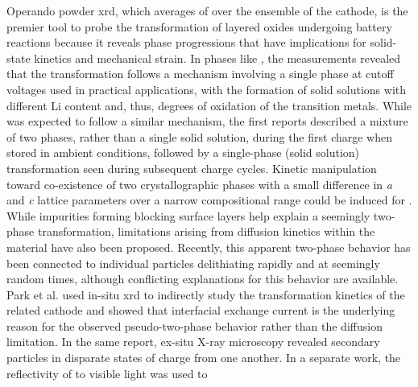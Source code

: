 \documentclass{article}
\begin{document}


Operando powder \gls{xrd}, which averages of over the ensemble of the cathode, is the premier tool to probe the transformation of layered oxides undergoing battery reactions because it reveals phase progressions that have implications for solid-state kinetics and mechanical strain.  In \nmc{} phases like \nmc[333]{}, the measurements revealed that the transformation follows a mechanism involving a single phase at cutoff voltages used in practical applications,\cite{hulzen2018,ahn2017,zhou2016-2} with the formation of solid solutions with different Li content and, thus, degrees of oxidation of the transition metals. While \nca{} was expected to follow a similar mechanism, the first reports described a mixture of two phases, rather than a single solid solution, during the first charge when stored in ambient conditions, followed by a
single-phase (solid solution) transformation seen during subsequent
charge cycles\cite{robert2015}. Kinetic manipulation toward co-existence of two
crystallographic phases with a small difference in \emph{a} and
\emph{c} lattice parameters over a narrow compositional range could be induced for \nmc[333]{} \cite{yoon2006,hua2018}. While impurities forming blocking surface layers help explain a seemingly two-phase
transformation\cite{grenier2017}, limitations arising from diffusion
kinetics within the material have also been proposed\cite{chapman2020}. Recently, this apparent two-phase behavior has been connected to individual particles delithiating rapidly and at
seemingly random times\cite{chueh2021, zhao2022, rao2021, wang2020-6},
although conflicting explanations for this behavior are available. Park et al. \cite{chueh2021} used in-situ
\gls{xrd} to indirectly study the transformation kinetics of the
related \nmc[333]{} cathode and showed that interfacial exchange
current is the underlying reason for the observed pseudo-two-phase
behavior rather than the  diffusion limitation. In the same
report, ex-situ X-ray microscopy revealed secondary particles in
disparate states of charge from one another. In a separate
work, the reflectivity of \nmc[532]{} to visible light was used to
\end{document}
